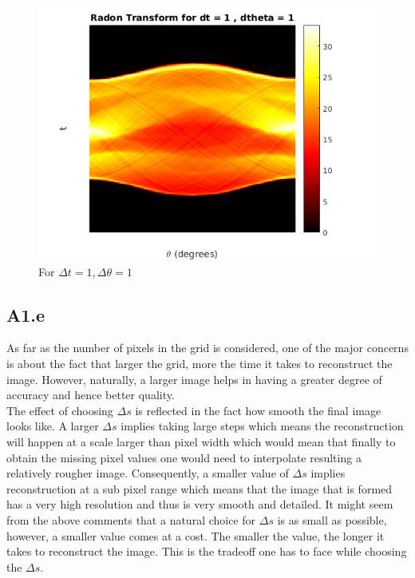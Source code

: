 \documentclass{article}
\begin{document}
\begin{figure}[h]
	\centering
	\includegraphics[scale = 0.5]{code/html/myRadonTrans_07.png}
	\caption{For $\Delta t = 1, \Delta \theta =1 $}
	\label{Fig :1d2}
\end{figure}


\subsection*{A1.e}
As far as the number of pixels in the grid is considered, one of the major concerns is about the fact that larger the grid, more the time it takes to reconstruct the image. However, naturally, a larger image helps in having a greater degree of accuracy and hence better quality. \\

The effect of choosing $ \Delta s $ is reflected in the fact how smooth the final image looks like. A larger $ \Delta s $ implies taking large steps which means the reconstruction will happen at a scale larger than pixel width which would mean that finally to obtain the missing pixel values one would need to interpolate resulting a relatively rougher image. Consequently, a smaller value of $ \Delta s $ implies reconstruction at a sub pixel range which means that the image that is formed has a very high resolution and thus is very smooth and detailed. It might seem from the above comments that a natural choice for $ \Delta s $ is as small as possible, however, a smaller value comes at a cost. The smaller the value, the longer it takes to reconstruct the image. This is the tradeoff one has to face while choosing the $ \Delta s $. \\
\end{document}
